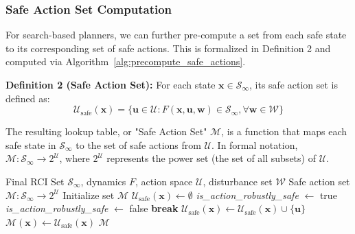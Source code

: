 \documentclass[conference]{IEEEtran}
\begin{document}
\subsubsection{Safe Action Set Computation}
For search-based planners, we can further pre-compute a set from each safe state to its corresponding set of safe actions. This is formalized in Definition 2 and computed via Algorithm~\ref{alg:precompute_safe_actions}.

\textbf{Definition 2 (Safe Action Set):} For each state $\mathbf{x} \in \mathcal{S}_\infty$, its safe action set is defined as:
\begin{equation}
\mathcal{U}_{\text{safe}}(\mathbf{x}) = \{\mathbf{u} \in \mathcal{U} : F(\mathbf{x}, \mathbf{u}, \mathbf{w}) \in \mathcal{S}_\infty, \forall \mathbf{w} \in \mathcal{W}\}
\label{eq:safe_action_set}
\end{equation}

The resulting lookup table, or "Safe Action Set" $\mathcal{M}$, is a function that maps each safe state in $\mathcal{S}_\infty$ to the set of safe actions from $\mathcal{U}$. In formal notation, $\mathcal{M}: \mathcal{S}_\infty \to 2^\mathcal{U}$, where $2^\mathcal{U}$ represents the power set (the set of all subsets) of $\mathcal{U}$.
\begin{algorithm}[H]
    \caption{Precomputation of the Safe Action Set ($\mathcal{M}$)}
    \label{alg:precompute_safe_actions}
    \begin{algorithmic}[1]
        \Require Final RCI Set $\mathcal{S}_\infty$, dynamics $F$, action space $\mathcal{U}$, disturbance set $\mathcal{W}$
        \Ensure Safe action set $\mathcal{M}: \mathcal{S}_\infty \to 2^{\mathcal{U}}$
        \State Initialize set $\mathcal{M}$
            \State $\mathcal{U}_{\text{safe}}(\mathbf{x}) \gets \emptyset$
                \State \textit{is\_action\_robustly\_safe} $\gets$ true
                        \State \textit{is\_action\_robustly\_safe} $\gets$ false
                        \State \textbf{break}
                    \EndIf
                \EndFor
                    \State $\mathcal{U}_{\text{safe}}(\mathbf{x}) \gets \mathcal{U}_{\text{safe}}(\mathbf{x}) \cup \{\mathbf{u}\}$
                \EndIf
            \EndFor
            \State $\mathcal{M}(\mathbf{x}) \gets \mathcal{U}_{\text{safe}}(\mathbf{x})$
        \EndFor
        \State \Return $\mathcal{M}$
    \end{algorithmic}
\end{algorithm}
\end{document}
